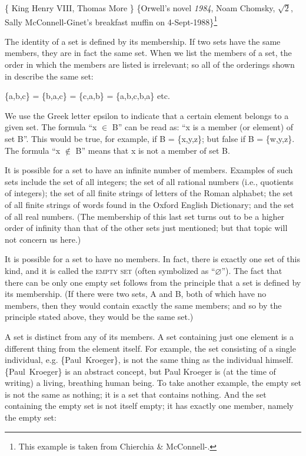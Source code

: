 \ea
\ea  \{ King Henry VIII, Thomas More \}
\ex  \{Orwell’s novel \textit{1984}, Noam Chomsky, $\sqrt{2}$, Sally McConnell-Ginet’s breakfast muffin on 4-Sept-1988\}\footnote{This example is taken from Chierchia \& McConnell-\citet[431]{Ginet1990}.}
\z
\z


The identity of a set is defined by its membership. If two sets have the same members, they are in fact the same set. When we list the members of a set, the order in which the members are listed is irrelevant; so all of the orderings shown in  describe the same set:


\ea
\{a,b,c\} = \{b,a,c\} = \{c,a,b\} = \{a,b,c,b,a\} etc. 
\z


We use the Greek letter epsilon to indicate that a certain element belongs to a given set. The formula “x ${\in}$ B” can be read as: “x is a member (or element) of set B”. This would be true, for example, if B = \{x,y,z\}; but false if B = \{w,y,z\}. The formula “x ${\notin}$ B” means that x is not a member of set B.



It is possible for a set to have an infinite number of members. Examples of such sets include the set of all integers; the set of all rational numbers (i.e., quotients of integers); the set of all finite strings of letters of the Roman alphabet; the set of all finite strings of words found in the Oxford English Dictionary; and the set of all real numbers. (The membership of this last set turns out to be a higher order of infinity than that of the other sets just mentioned; but that topic will not concern us here.)



It is possible for a set to have no members. In fact, there is exactly one set of this kind, and it is called the \textsc{empty set} (often symbolized as “⌀”). The fact that there can be only one empty set follows from the principle that a set is defined by its membership. (If there were two sets, A and B, both of which have no members, then they would contain exactly the same members; and so by the principle stated above, they would be the same set.)



A set is distinct from any of its members. A set containing just one element is a different thing from the element itself. For example, the set consisting of a single individual, e.g. \{Paul~Kroeger\}, is not the same thing as the individual himself. \{Paul~Kroeger\} is an abstract concept, but Paul Kroeger is (at the time of writing) a living, breathing human being. To take another example, the empty set is not the same as nothing; it is a set that contains nothing. And the set containing the empty set is not itself empty; it has exactly one member, namely the empty set:


